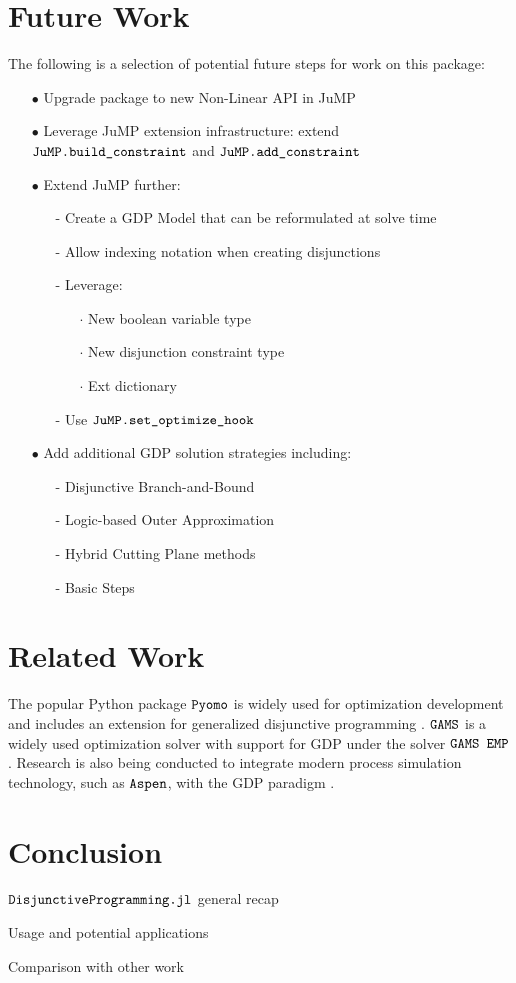 \documentclass{juliacon}
\begin{document}
\section{Future Work}
The following is a selection of potential future steps for work on this package:
\vskip 6pt
\begin{itemize}
  \item[$\bullet$] Upgrade package to new Non-Linear API in JuMP
  \item[$\bullet$] Leverage JuMP extension infrastructure: extend \\ $\verb|JuMP.build_constraint|$ and $\verb|JuMP.add_constraint|$
  \item[$\bullet$] Extend JuMP further:
        \begin{itemize}
            \item[-] Create a GDP Model that can be reformulated at solve time
            \item[-] Allow indexing notation when creating disjunctions
            \item[-] Leverage:
            \begin{itemize}
                \item[$\cdot$] New boolean variable type
                \item[$\cdot$] New disjunction constraint type
                \item[$\cdot$] Ext dictionary
            \end{itemize}
            \item[-] Use $\verb|JuMP.set_optimize_hook|$
        \end{itemize}
    \item[$\bullet$] Add additional GDP solution strategies including:
        \begin{itemize}
            \item[-] Disjunctive Branch-and-Bound
            \item[-] Logic-based Outer Approximation
            \item[-] Hybrid Cutting Plane methods
            \item[-] Basic Steps
        \end{itemize}
\end{itemize}
\vskip 6pt

\section{Related Work}
The popular Python package $\verb|Pyomo|$ is widely used for optimization development and includes an extension for generalized disjunctive programming \cite{bynum2021pyomo, hart2011pyomo}. $\verb|GAMS|$ is a widely used optimization solver with support for GDP under the solver $\verb|GAMS EMP|$ \cite{Bussieck2004}. Research is also being conducted to integrate modern process simulation technology, such as $\verb|Aspen|$, with the GDP paradigm \cite{NAVARROAMOROS201413}.
\vskip 6pt

\section{Conclusion}
$\verb|DisjunctiveProgramming.jl|$ general recap

Usage and potential applications

Comparison with other work


\end{document}
